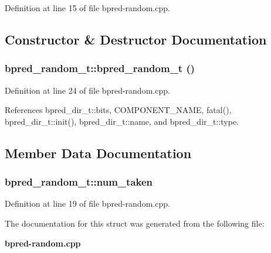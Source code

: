 Definition at line 15 of file bpred-random.cpp.

\subsection{Constructor \& Destructor Documentation}
\subsubsection[{bpred\_\-random\_\-t}]{\setlength{\rightskip}{0pt plus 5cm}bpred\_\-random\_\-t::bpred\_\-random\_\-t ()\hspace{0.3cm}{\tt  [inline]}}\label{structbpred__random__t_9627992e27d684f48fa919c8d65d9841}




Definition at line 24 of file bpred-random.cpp.

References bpred\_\-dir\_\-t::bits, COMPONENT\_\-NAME, fatal(), bpred\_\-dir\_\-t::init(), bpred\_\-dir\_\-t::name, and bpred\_\-dir\_\-t::type.

\subsection{Member Data Documentation}
\subsubsection[{num\_\-taken}]{ {\bf bpred\_\-random\_\-t::num\_\-taken}\hspace{0.3cm}{\tt  [protected]}}\label{structbpred__random__t_a0288eaec5fb672b8aefdf83d92add9b}




Definition at line 19 of file bpred-random.cpp.

The documentation for this struct was generated from the following file:\begin{CompactItemize}
\item 
{\bf bpred-random.cpp}\end{CompactItemize}
